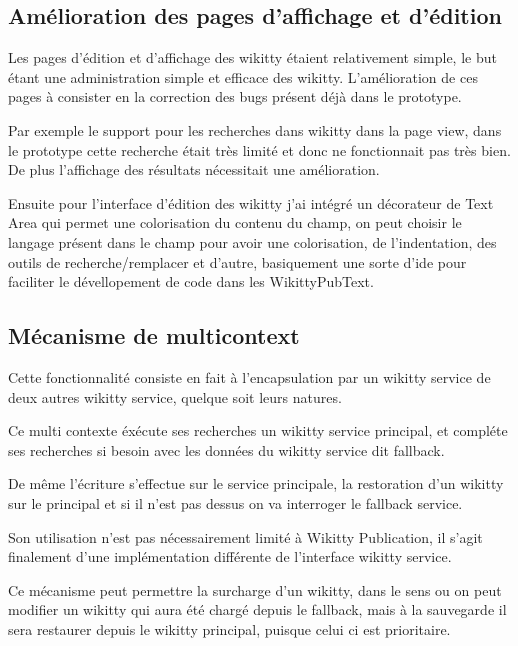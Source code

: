 \subsection{Amélioration des pages d'affichage et d'édition}

Les pages d'édition et d'affichage des wikitty étaient relativement simple, le
but étant une administration simple et efficace des wikitty. L'amélioration de
ces pages à consister en la correction des bugs présent déjà dans le prototype.

Par exemple le support pour les recherches dans wikitty dans la page view,
dans le prototype cette recherche était très limité et donc ne fonctionnait pas
très bien. De plus l'affichage des résultats nécessitait une amélioration.

Ensuite pour l'interface d'édition des wikitty j'ai intégré un décorateur de
Text Area qui permet une colorisation du contenu du champ, on peut choisir le
langage présent dans le champ pour avoir une colorisation, de l'indentation, des
outils de recherche/remplacer et d'autre, basiquement une sorte d'ide pour
faciliter le dévellopement de code dans les WikittyPubText.



\subsection{Mécanisme de multicontext}

Cette fonctionnalité consiste en fait à l'encapsulation par un wikitty service
de deux autres wikitty service, quelque soit leurs natures.

Ce multi contexte éxécute ses recherches un wikitty service principal, et
compléte ses recherches si besoin avec les données du wikitty service dit
fallback.

De même l'écriture s'effectue sur le service principale, la restoration d'un
wikitty sur le principal et si il n'est pas dessus on va interroger le fallback
service.


Son utilisation n'est pas nécessairement limité à Wikitty Publication, il s'agit
finalement d'une implémentation différente de l'interface wikitty service. 

Ce mécanisme peut permettre la surcharge d'un wikitty, dans le sens ou on peut
modifier un wikitty qui aura été chargé depuis le fallback, mais à la sauvegarde
il sera restaurer depuis le wikitty principal, puisque celui ci est prioritaire.

